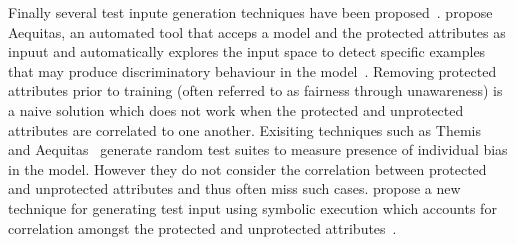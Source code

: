 \documentclass{article}
\begin{document}
Finally several test inpute generation techniques have been
proposed \cite{aggarwal2019black,udeshi2018automated}.
\citeauthor{udeshi2018automated} propose Aequitas, an automated tool
that acceps a model and the protected attributes as inpuut and
automatically explores the input space to detect specific examples
that may produce discriminatory behaviour in the
model \cite{udeshi2018automated}. Removing protected attributes prior
to training (often referred to as fairness through unawareness) is a
naive solution which does not work when the protected and unprotected
attributes are correlated to one another. Exisiting techniques such as
Themis \cite{galhotra2017fairness} and
Aequitas \cite{udeshi2018automated} generate random test suites to
measure presence of individual bias in the model. However they do not
consider the correlation between protected and unprotected attributes
and thus often miss such cases. \citeauthor{aggarwal2019black} propose
a new technique for generating test input using symbolic execution
which accounts for correlation amongst the protected and unprotected
attributes \cite{aggarwal2019black}.







\end{document}

